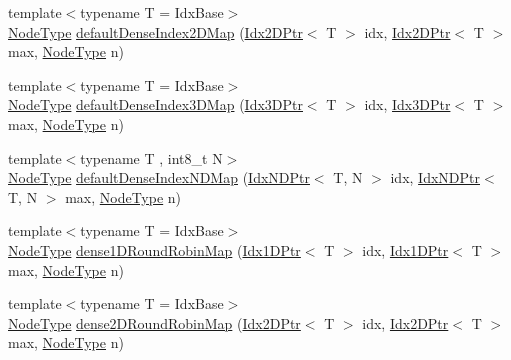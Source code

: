 \begin{DoxyCompactItemize}
\item 
{\footnotesize template$<$typename T  = Idx\+Base$>$ }\\\hyperlink{namespacevt_a866da9d0efc19c0a1ce79e9e492f47e2}{Node\+Type} \hyperlink{namespacevt_1_1mapping_a011c4e2cb832d3edcd98e3803d405ad4}{default\+Dense\+Index2\+D\+Map} (\hyperlink{namespacevt_1_1mapping_a6832cbb1361fe72fd7ec730e7b7773b3}{Idx2\+D\+Ptr}$<$ T $>$ idx, \hyperlink{namespacevt_1_1mapping_a6832cbb1361fe72fd7ec730e7b7773b3}{Idx2\+D\+Ptr}$<$ T $>$ max, \hyperlink{namespacevt_a866da9d0efc19c0a1ce79e9e492f47e2}{Node\+Type} n)
\item 
{\footnotesize template$<$typename T  = Idx\+Base$>$ }\\\hyperlink{namespacevt_a866da9d0efc19c0a1ce79e9e492f47e2}{Node\+Type} \hyperlink{namespacevt_1_1mapping_a776a69138a1fbceab5bbf10b9c07a858}{default\+Dense\+Index3\+D\+Map} (\hyperlink{namespacevt_1_1mapping_aacc737158b6517f2d760ffc8d1b5abca}{Idx3\+D\+Ptr}$<$ T $>$ idx, \hyperlink{namespacevt_1_1mapping_aacc737158b6517f2d760ffc8d1b5abca}{Idx3\+D\+Ptr}$<$ T $>$ max, \hyperlink{namespacevt_a866da9d0efc19c0a1ce79e9e492f47e2}{Node\+Type} n)
\item 
{\footnotesize template$<$typename T , int8\+\_\+t N$>$ }\\\hyperlink{namespacevt_a866da9d0efc19c0a1ce79e9e492f47e2}{Node\+Type} \hyperlink{namespacevt_1_1mapping_a39633710d765933d6d91b8bb9818fcc7}{default\+Dense\+Index\+N\+D\+Map} (\hyperlink{namespacevt_1_1mapping_ab77f5302cd346d499e48a8c796043746}{Idx\+N\+D\+Ptr}$<$ T, N $>$ idx, \hyperlink{namespacevt_1_1mapping_ab77f5302cd346d499e48a8c796043746}{Idx\+N\+D\+Ptr}$<$ T, N $>$ max, \hyperlink{namespacevt_a866da9d0efc19c0a1ce79e9e492f47e2}{Node\+Type} n)
\item 
{\footnotesize template$<$typename T  = Idx\+Base$>$ }\\\hyperlink{namespacevt_a866da9d0efc19c0a1ce79e9e492f47e2}{Node\+Type} \hyperlink{namespacevt_1_1mapping_a2a4e62c5dc17da0032d3953c7e3cde8b}{dense1\+D\+Round\+Robin\+Map} (\hyperlink{namespacevt_1_1mapping_a8b576cf2f31069778e4951f64bccafd8}{Idx1\+D\+Ptr}$<$ T $>$ idx, \hyperlink{namespacevt_1_1mapping_a8b576cf2f31069778e4951f64bccafd8}{Idx1\+D\+Ptr}$<$ T $>$ max, \hyperlink{namespacevt_a866da9d0efc19c0a1ce79e9e492f47e2}{Node\+Type} n)
\item 
{\footnotesize template$<$typename T  = Idx\+Base$>$ }\\\hyperlink{namespacevt_a866da9d0efc19c0a1ce79e9e492f47e2}{Node\+Type} \hyperlink{namespacevt_1_1mapping_ac606a5886c93a4dbb05dfead285c30c6}{dense2\+D\+Round\+Robin\+Map} (\hyperlink{namespacevt_1_1mapping_a6832cbb1361fe72fd7ec730e7b7773b3}{Idx2\+D\+Ptr}$<$ T $>$ idx, \hyperlink{namespacevt_1_1mapping_a6832cbb1361fe72fd7ec730e7b7773b3}{Idx2\+D\+Ptr}$<$ T $>$ max, \hyperlink{namespacevt_a866da9d0efc19c0a1ce79e9e492f47e2}{Node\+Type} n)

\end{DoxyCompactItemize}
